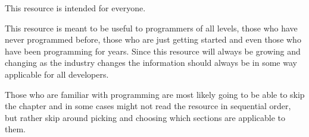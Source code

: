 This resource is intended for everyone.
\par

This resource is meant to be useful to programmers of all levels, those who have never programmed before, those who are just
getting started and even those who have been programming for years.
Since this resource will always be growing and changing as the industry changes the information should always be in some
way applicable for all developers.
\par

Those who are familiar with programming are most likely going to be able to skip the chapter  and in
some cases might not read the resource in sequential order, but rather skip around picking and choosing which sections are
applicable to them.

